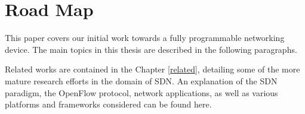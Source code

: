 %
%

\section{Road Map}
\label{intro:map}
This paper covers our initial work towards a fully programmable networking
device. The main topics in this thesis are described in the following
paragraphs.

Related works are contained in the Chapter \ref{related}, detailing some of the
more mature research efforts in the domain of SDN. An explanation of the SDN
paradigm, the OpenFlow protocol, network applications, as well as various
platforms and frameworks considered can be found here.

